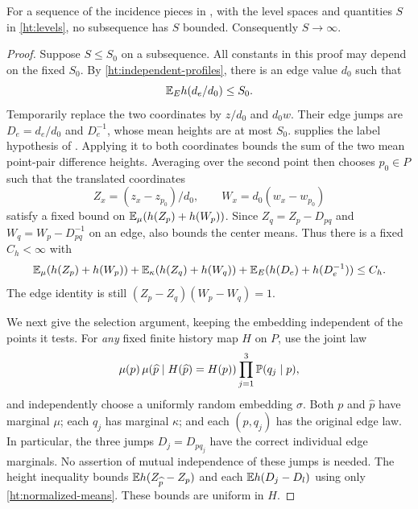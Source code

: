 \begin{proposition}\label{ht:bounded}
For a sequence of the incidence pieces in , with the
level spaces and quantities $S$ in \eqref{ht:levels}, no subsequence
has $S$ bounded. Consequently $S\to\infty$.
\end{proposition}

\begin{proof}
Suppose $S\le S_0$ on a subsequence. All constants in this proof may
depend on the fixed $S_0$. By \eqref{ht:independent-profiles}, there is an
edge value $d_0$ such that
\[
 \mathbb E_Eh(d_e/d_0)\le S_0.
\]
Temporarily replace the two coordinates by $z/d_0$ and $d_0w$.
Their edge jumps are $D_e=d_e/d_0$ and $D_e^{-1}$, whose mean heights
are at most $S_0$.  supplies the label hypothesis of
. Applying it to both coordinates bounds the sum of
the two mean point-pair difference heights. Averaging over the second
point then chooses $p_0\in P$ such that the translated coordinates
\[
 Z_x=(z_x-z_{p_0})/d_0,\qquad W_x=d_0(w_x-w_{p_0})
\]
satisfy a fixed bound on $\mathbb E_\mu(h(Z_p)+h(W_p))$.
Since $Z_q=Z_p-D_{pq}$ and $W_q=W_p-D_{pq}^{-1}$ on an edge,
 also bounds the center means. Thus there is a fixed
$C_h<\infty$ with
\begin{equation}\label{ht:normalized-means}
 \mathbb E_\mu(h(Z_p)+h(W_p))
 +\mathbb E_\kappa(h(Z_q)+h(W_q))
 +\mathbb E_E(h(D_e)+h(D_e^{-1}))\le C_h.
\end{equation}
The edge identity is still
$(Z_p-Z_q)(W_p-W_q)=1$.

We next give the selection argument, keeping the embedding independent
of the points it tests. For \emph{any} fixed finite history map $H$ on
$P$, use the joint law
\begin{equation}\label{ht:coupling}
 \mu(p)\,\mu(\widehat p\mid H(\widehat p)=H(p))
             \prod_{j=1}^3\mathbb P(q_j\mid p),
\end{equation}
and independently choose a uniformly random embedding $\sigma$.
Both $p$ and $\widehat p$ have marginal $\mu$; each $q_j$ has marginal
$\kappa$; and each $(p,q_j)$ has the original edge law.
In particular, the three jumps $D_j=D_{pq_j}$ have the correct individual
edge marginals. No assertion of mutual independence of these jumps is
needed. The height inequality bounds
$\mathbb E h(Z_{\widehat p}-Z_p)$ and each $\mathbb E h(D_j-D_l)$ using only
\eqref{ht:normalized-means}. These bounds are uniform in $H$.


\end{proof}
